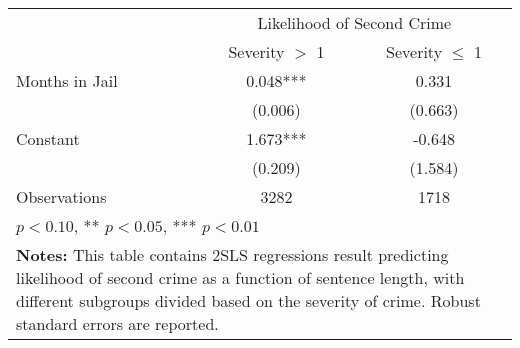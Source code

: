 \begin{tabular}{l*{2}{c}}
\hline\hline
                    &\multicolumn{2}{c}{Likelihood of Second Crime}\\
                    &\multicolumn{1}{c}{Severity $>$ 1}&\multicolumn{1}{c}{Severity $\le$ 1}\\

\hline
Months in Jail      &       0.048***&       0.331         \\
                    &     (0.006)         &     (0.663)         \\
[1em]
Constant            &       1.673***&      -0.648         \\
                    &     (0.209)         &     (1.584)         \\
\hline
Observations        &        3282         &        1718         \\
\hline\hline
\multicolumn{3}{l}{\footnotesize * \(p<0.10\), ** \(p<0.05\), *** \(p<0.01\)}\\
\multicolumn{3}{p{0.6\linewidth}}{\small \textbf{Notes:} This table contains 2SLS regressions result predicting likelihood of second crime as a function of sentence length, with different subgroups divided based on the severity of crime. Robust standard errors are reported.} \\
\end{tabular}

